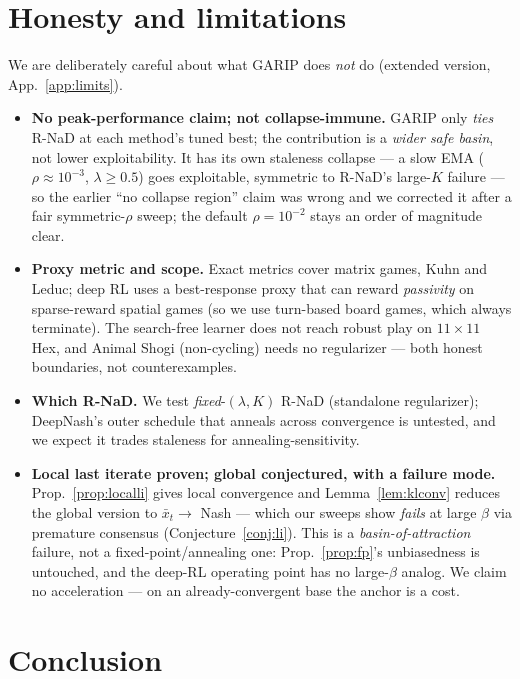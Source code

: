 \documentclass[10pt,twocolumn]{article}
\theoremstyle{plain}
\theoremstyle{remark}
\begin{document}
\FloatBarrier
\section{Honesty and limitations}

We are deliberately careful about what GARIP does \emph{not} do (extended version,
App.~\ref{app:limits}).
\begin{itemize}
  \item \textbf{No peak-performance claim; not collapse-immune.} GARIP only \emph{ties}
  R-NaD at each method's tuned best; the contribution is a \emph{wider safe basin}, not
  lower exploitability. It has its own staleness collapse --- a slow EMA
  ($\rho\!\approx\!10^{-3}$, $\lambda\!\ge\!0.5$) goes exploitable, symmetric to R-NaD's
  large-$K$ failure --- so the earlier ``no collapse region'' claim was wrong and we
  corrected it after a fair symmetric-$\rho$ sweep; the default $\rho\!=\!10^{-2}$ stays
  an order of magnitude clear.
  \item \textbf{Proxy metric and scope.} Exact metrics cover matrix games, Kuhn and
  Leduc; deep RL uses a best-response proxy that can reward \emph{passivity} on
  sparse-reward spatial games (so we use turn-based board games, which always terminate).
  The search-free learner does not reach robust play on $11\times11$ Hex, and Animal
  Shogi (non-cycling) needs no regularizer --- both honest boundaries, not counterexamples.
  \item \textbf{Which R-NaD.} We test \emph{fixed}-$(\lambda,K)$ R-NaD (standalone
  regularizer); DeepNash's outer schedule that anneals across convergence is untested,
  and we expect it trades staleness for annealing-sensitivity.
  \item \textbf{Local last iterate proven; global conjectured, with a failure mode.}
  Prop.~\ref{prop:localli} gives local convergence and Lemma~\ref{lem:klconv} reduces the
  global version to $\bar x_t\!\to$ Nash --- which our sweeps show \emph{fails} at large
  $\beta$ via premature consensus (Conjecture~\ref{conj:li}). This is a
  \emph{basin-of-attraction} failure, not a fixed-point/annealing one:
  Prop.~\ref{prop:fp}'s unbiasedness is untouched, and the deep-RL operating point has no
  large-$\beta$ analog. We claim no acceleration --- on an already-convergent base the
  anchor is a cost.
\end{itemize}

\section{Conclusion}
\end{document}
